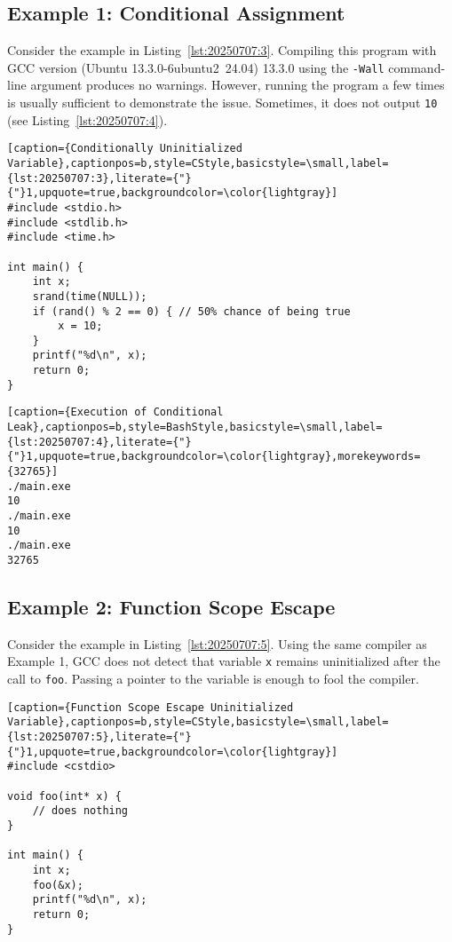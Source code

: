 \subsection*{Example 1: Conditional Assignment}

Consider the example in Listing~\ref{lst:20250707:3}. Compiling this program with GCC version (Ubuntu 13.3.0-6ubuntu2~24.04) 13.3.0 using the \texttt{-Wall} command-line argument produces no warnings. However, running the program a few times is usually sufficient to demonstrate the issue. Sometimes, it does not output \texttt{10} (see Listing~\ref{lst:20250707:4}).

\begin{lstlisting}[caption={Conditionally Uninitialized Variable},captionpos=b,style=CStyle,basicstyle=\small,label={lst:20250707:3},literate={"}{"}1,upquote=true,backgroundcolor=\color{lightgray}]
#include <stdio.h>
#include <stdlib.h>
#include <time.h>

int main() {
	int x;
	srand(time(NULL));
	if (rand() % 2 == 0) { // 50% chance of being true
		x = 10;
	}
	printf("%d\n", x);
	return 0;
}
\end{lstlisting}

\begin{lstlisting}[caption={Execution of Conditional Leak},captionpos=b,style=BashStyle,basicstyle=\small,label={lst:20250707:4},literate={"}{"}1,upquote=true,backgroundcolor=\color{lightgray},morekeywords={32765}]
./main.exe
10
./main.exe
10
./main.exe
32765
\end{lstlisting}

\subsection*{Example 2: Function Scope Escape}

Consider the example in Listing~\ref{lst:20250707:5}. Using the same compiler as Example 1, GCC does not detect that variable \texttt{x} remains uninitialized after the call to \texttt{foo}. Passing a pointer to the variable is enough to fool the compiler.

\begin{lstlisting}[caption={Function Scope Escape Uninitialized Variable},captionpos=b,style=CStyle,basicstyle=\small,label={lst:20250707:5},literate={"}{"}1,upquote=true,backgroundcolor=\color{lightgray}]
#include <cstdio>

void foo(int* x) {
	// does nothing
}

int main() {
	int x;
	foo(&x);
	printf("%d\n", x);
	return 0;
}
\end{lstlisting}

